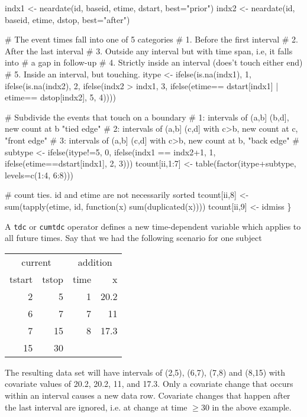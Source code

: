 \documentclass{article}
\newcommand{\code}[1]{\texttt{#1}}
\begin{document}
\begin{nwchunk}
     indx1 <- neardate(id, baseid, etime, dstart, best="prior")
     indx2 <- neardate(id, baseid, etime, dstop, best="after")
 
     # The event times fall into one of 5 categories
     #   1. Before the first interval
     #   2. After the last interval
     #   3. Outside any interval but with time span, i.e, it falls into
     #       a gap in follow-up
     #   4. Strictly inside an interval (does't touch either end)
     #   5. Inside an interval, but touching.
     itype <- ifelse(is.na(indx1), 1,
                     ifelse(is.na(indx2), 2, 
                            ifelse(indx2 > indx1, 3,
                                   ifelse(etime== dstart[indx1] | 
                                          etime== dstop[indx2], 5, 4))))
 
     # Subdivide the events that touch on a boundary
     #  1: intervals of (a,b] (b,d], new count at b  "tied edge"
     #  2: intervals of (a,b] (c,d] with c>b, new count at c, "front edge"
     #  3: intervals of (a,b] (c,d] with c>b, new count at b, "back edge"
     #
     subtype <- ifelse(itype!=5, 0, 
                       ifelse(indx1 == indx2+1, 1,
                              ifelse(etime==dstart[indx1], 2, 3)))
     tcount[ii,1:7] <- table(factor(itype+subtype, levels=c(1:4, 6:8)))
 
     # count ties.  id and etime are not necessarily sorted
     tcount[ii,8] <- sum(tapply(etime, id, function(x) sum(duplicated(x))))
     tcount[ii,9] <- idmiss
 \}
\end{nwchunk}

A \code{tdc} or \code{cumtdc} operator defines a new time-dependent
variable which applies to all future times.
Say that we had the following scenario for one subject
\begin{center}
  \begin{tabular}{rr|rr}
    \multicolumn{2}{c}{current} & \multicolumn{2}{c}{addition} \\
    tstart & tstop & time & x \\
    2 & 5 & 1 & 20.2 \\
    6 & 7 & 7 & 11 \\
    7 & 15 &  8  & 17.3 \\
    15 & 30 \\
    \end{tabular}
  \end{center}
The resulting data set will have intervals of (2,5), (6,7), (7,8) and (8,15)
with covariate values of 20.2, 20.2,  11, and 17.3.
Only a covariate change that occurs within an interval causes a new data
row.  Covariate changes that happen after the last interval are ignored,
i.e. at change at time $\ge 30$ in the above example.
\end{document}
